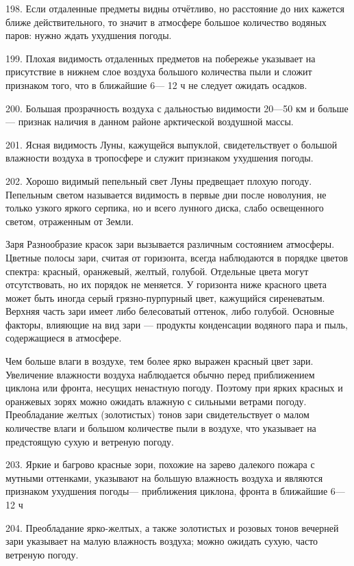 198. Если отдаленные предметы видны отчётливо, но расстояние до них кажется ближе действительного, то значит в атмосфере большое количество водяных паров: нужно ждать ухудшения погоды.

199. Плохая видимость отдаленных предметов на побережье указывает на присутствие в нижнем слое воздуха большого количества пыли и сложит признаком того, что в ближайшие 6— 12 ч не следует ожидать осадков.

200. Большая прозрачность воздуха с дальностью видимости 20—50 км и больше — признак наличия в данном районе арктической воздушной массы.

201. Ясная видимость Луны, кажущейся выпуклой, свидетельствует о большой влажности воздуха в тропосфере и служит признаком ухудшения погоды.

202. Хорошо видимый пепельный свет Луны предвещает плохую погоду. Пепельным светом называется видимость в первые дни после новолуния, не только узкого яркого серпика, но и всего лунного диска, слабо освещенного светом, отраженным от Земли.

Заря
Разнообразие красок зари вызывается различным состоянием атмосферы. Цветные полосы зари, считая от горизонта, всегда наблюдаются в порядке цветов спектра: красный, оранжевый, желтый, голубой. Отдельные цвета могут отсутствовать, но их порядок не меняется. У горизонта ниже красного цвета может быть иногда серый грязно-пурпурный цвет, кажущийся сиреневатым. Верхняя часть зари имеет либо белесоватый оттенок, либо голубой. Основные факторы, влияющие на вид зари — продукты конденсации водяного пара и пыль, содержащиеся в атмосфере.

Чем больше влаги в воздухе, тем более ярко выражен красный цвет зари. Увеличение влажности воздуха наблюдается обычно перед приближением циклона или фронта, несущих ненастную погоду. Поэтому при ярких красных и оранжевых зорях можно ожидать влажную с сильными ветрами погоду. Преобладание желтых (золотистых) тонов зари свидетельствует о малом количестве влаги и большом количестве пыли в воздухе, что указывает на предстоящую сухую и ветреную погоду.

203. Яркие и багрово красные зори, похожие на зарево далекого пожара с мутными оттенками, указывают на большую влажность воздуха и являются признаком ухудшения погоды— приближения циклона, фронта в ближайшие 6—12 ч

204. Преобладание ярко-желтых, а также золотистых и розовых тонов вечерней зари указывает на малую влажность воздуха; можно ожидать сухую, часто ветреную погоду.

